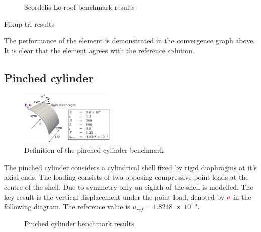 \singlespacing
\begin{figure}[H]
	\caption{\label{ref_label_overall}Scordelis-Lo roof benchmark results}
\end{figure}

\doublespacing

Fixup tri results

The performance of the element is demonstrated in the convergence graph above. It is clear that the element agrees with the reference solution.

\subsection{Pinched cylinder}

\begin{figure}
	\centering
	\includegraphics[width=0.4\textwidth]{images/pinchedcylinder.png}
	\caption{Definition of the pinched cylinder benchmark\cite{Bou13}}
\end{figure}

The pinched cylinder considers a cylindrical shell fixed by rigid diaphragms at it's axial ends. The loading consists of two opposing compressive point loads at the centre of the shell. Due to symmetry only an eighth of the shell is modelled. The key result is the vertical displacement under the point load, denoted by $\textcolor{red}{u}$ in the following diagram. The reference value is $u_{ref} =  1.8248\ \times\ 10^{-5}$. 

\singlespacing
\begin{figure}[H]
	\caption{\label{ref_label_overall}Pinched cylinder benchmark results}
\end{figure}

